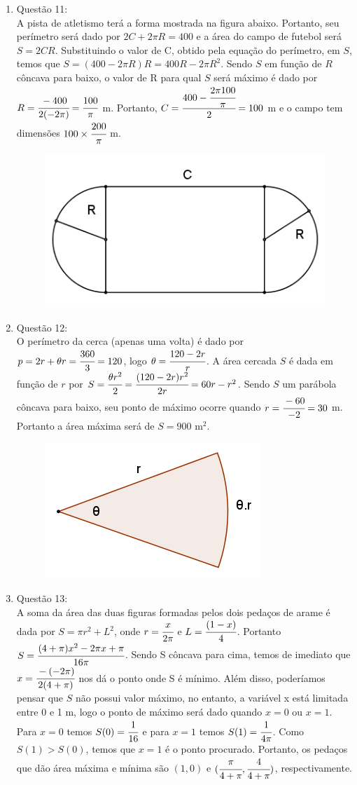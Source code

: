 \documentclass[a4paper]{report}
\begin{document}
\begin{enumerate}
		\item Questão 11:\\A pista de atletismo terá a forma mostrada na figura abaixo. Portanto, seu perímetro será dado por $2C + 2\pi R = 400$  e a área do campo de futebol será $S = 2CR$. Substituindo o valor de C, obtido pela equação do perímetro, em $S$, temos que $S=(400-2\pi R)R=400R-2\pi  R^2$. Sendo $S$ em função de $R$ côncava para baixo, o valor de R para qual $S$ será máximo é dado por $R=\cfrac{-400}{2(-2\pi)}=\cfrac{100}{\pi}$ m. Portanto, $C = \cfrac{400-\cfrac{2\pi 100}{\pi}}{2}=100$ m e o campo tem dimensões $100\times\cfrac{200}{\pi}$ m.

		{
			\begin{figure}[!t]
				\centering
			 	\includegraphics[height=0.2\linewidth]{q11.png}
			\end{figure}
		}	

		\item Questão 12:\\ O perímetro da cerca (apenas uma volta) é dado por $p=2r+\theta r = \cfrac{360}{3}=120$, logo $\theta = \cfrac{120-2r}{r}$. A área cercada $S$ é dada em função de $r$ por $S=\cfrac{\theta r^2}{2}=\cfrac{(120-2r)r^2}{2r}=60r-r^2$. Sendo $S$ um parábola côncava para baixo, seu ponto de máximo ocorre quando $r=\cfrac{-60}{-2}=30$ m. Portanto a área máxima será de $S=900$ m$^2$.

		{
			\begin{figure}[!th]
				\centering
			 	\includegraphics[height=0.2\linewidth]{q12.png}
			\end{figure}
		}	

		\item Questão 13:\\ A soma da área das duas figuras formadas pelos dois pedaços de arame é dada por $S = \pi r^2 + L^2$, onde $r=\cfrac{x}{2\pi}$ e $L = \cfrac{(1-x)}{4}$. Portanto $S=\cfrac{(4+\pi)x^2-2\pi x+\pi}{16\pi}$. Sendo S côncava para cima, temos de imediato que $x=\cfrac{-(-2\pi)}{2(4+\pi)}$  nos dá o ponto onde S é mínimo. Além disso, poderíamos pensar que $S$ não possui valor máximo, no entanto, a variável x está limitada entre 0 e 1 m, logo o ponto de máximo será dado quando $x =0$ ou $x=1$. Para $x=0$ temos $S(0) = \cfrac{1}{16}$ e para $x=1$ temos $S(1)=\cfrac{1}{4\pi}$. Como $S(1) > S(0)$, temos que $x=1$ é o ponto procurado. Portanto, os pedaços que dão área máxima e mínima são $(1,0)$ e $(\cfrac{\pi}{4+\pi}, \cfrac{4}{4+\pi})$, respectivamente.


\end{enumerate}
\end{document}
